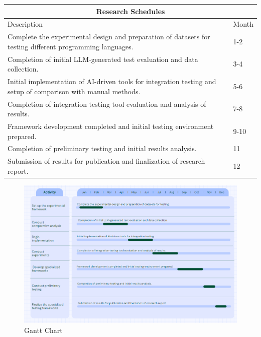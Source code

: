 \documentclass[12pt,a4paper]{article}
\begin{document}
\begin{center}
\begin{tabular}{ |p{10cm}|p{5cm}|}
 \hline
 \multicolumn{2}{|c|}{Research Schedules} \\
 \hline
 Description & Month \\
 \hline
 Complete the experimental design and preparation of datasets for testing different programming languages.   & 1-2    \\
 \hline
Completion of initial LLM-generated test evaluation and data collection. & 3-4 \\
 \hline
Initial implementation of AI-driven tools for integration testing and setup of comparison with manual methods. & 5-6 \\
\hline
Completion of integration testing tool evaluation and analysis of results. & 7-8 \\
\hline
Framework development completed and initial testing environment prepared. & 9-10 \\
\hline
Completion of preliminary testing and initial results analysis. & 11 \\
\hline
Submission of results for publication and finalization of research report. & 12 \\
 \hline 
\end{tabular}
\end{center}
\begin{figure}
    \centering
    \label{fig:Gantt Chart}
    \includegraphics[width=1\linewidth]{Gantt Chart.png}
    \caption{Gantt Chart}
    
\end{figure}
\newpage



\end{document}
